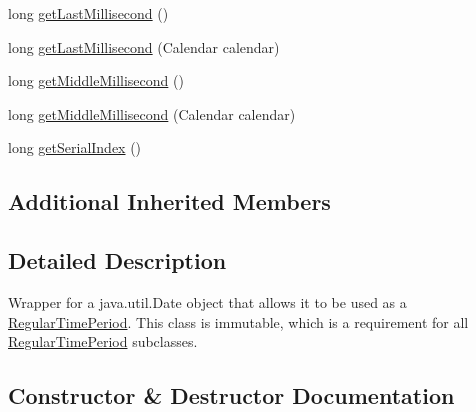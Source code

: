 \begin{DoxyCompactItemize}
\item 
long \mbox{\hyperlink{classorg_1_1jfree_1_1data_1_1time_1_1_fixed_millisecond_a79ddbfc6873cc821afbc9f6fda97194f}{get\+Last\+Millisecond}} ()
\item 
long \mbox{\hyperlink{classorg_1_1jfree_1_1data_1_1time_1_1_fixed_millisecond_aeb9356f3a9c22367e5c47d4cd3be0fff}{get\+Last\+Millisecond}} (Calendar calendar)
\item 
long \mbox{\hyperlink{classorg_1_1jfree_1_1data_1_1time_1_1_fixed_millisecond_a4b2079c6950b1c169474f5d161a3b4f1}{get\+Middle\+Millisecond}} ()
\item 
long \mbox{\hyperlink{classorg_1_1jfree_1_1data_1_1time_1_1_fixed_millisecond_aa8df306db6a1066dea4d3e5741e2871f}{get\+Middle\+Millisecond}} (Calendar calendar)
\item 
long \mbox{\hyperlink{classorg_1_1jfree_1_1data_1_1time_1_1_fixed_millisecond_a707613a6cec428d9ef7b772bd8078bcd}{get\+Serial\+Index}} ()
\end{DoxyCompactItemize}
\subsection*{Additional Inherited Members}


\subsection{Detailed Description}
Wrapper for a {\ttfamily java.\+util.\+Date} object that allows it to be used as a \mbox{\hyperlink{classorg_1_1jfree_1_1data_1_1time_1_1_regular_time_period}{Regular\+Time\+Period}}. This class is immutable, which is a requirement for all \mbox{\hyperlink{classorg_1_1jfree_1_1data_1_1time_1_1_regular_time_period}{Regular\+Time\+Period}} subclasses. 

\subsection{Constructor \& Destructor Documentation}
\mbox{\label{classorg_1_1jfree_1_1data_1_1time_1_1_fixed_millisecond_ac6383e5e9eefae4117c7494fbae0b683}} 
